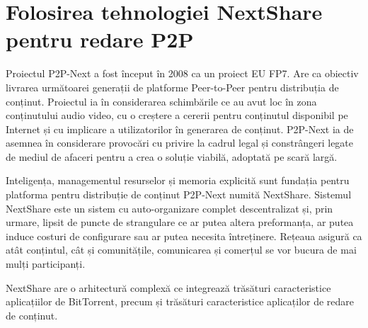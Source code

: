 \section{Folosirea tehnologiei NextShare pentru redare P2P}
\label{sec:multimedia-dist:nextshare}

Proiectul P2P-Next a fost început în 2008 ca un proiect EU FP7. Are ca obiectiv
livrarea următoarei generații de platforme Peer-to-Peer pentru distribuția de
conținut. Proiectul ia în considerarea schimbările ce au avut loc în zona
conținutului audio video, cu o creștere a cererii pentru conținutul disponibil
pe Internet și cu implicare a utilizatorilor în generarea de conținut.
P2P-Next ia de asemnea în considerare provocări cu privire la cadrul legal și
constrângeri legate de mediul de afaceri pentru a crea o soluție viabilă,
adoptată pe scară largă.

Inteligența, managementul resurselor și memoria explicită sunt fundația pentru
platforma pentru distribuție de conținut P2P-Next numită NextShare. Sistemul
NextShare este un sistem cu auto-organizare complet descentralizat și, prin
urmare, lipsit de puncte de strangulare ce ar putea altera preformanța, ar
putea induce costuri de configurare sau ar putea necesita întreținere.
Rețeaua asigură ca atât conțintul, cât și comunitățile, comunicarea și
comerțul se vor bucura de mai mulți participanți.

NextShare are o arhitectură complexă ce integrează trăsături caracteristice
aplicațiilor de BitTorrent, precum și trăsături caracteristice aplicaților de
redare de conținut.

